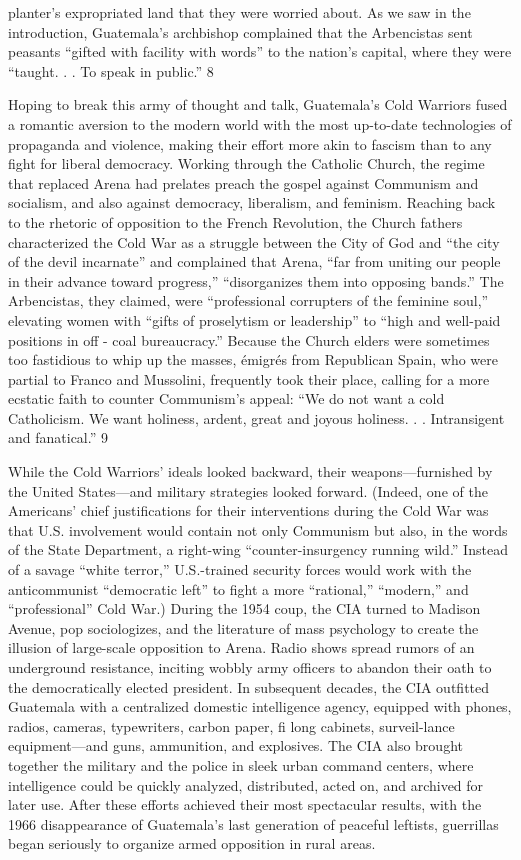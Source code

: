 planter’s expropriated land that they were worried about. As we saw in the introduction, Guatemala’s archbishop complained that the Arbencistas sent peasants “gifted with facility with words” to the nation’s capital, where they were “taught. . . To speak in public.” {\color{blue} 8 } {\par} Hoping to break this army of thought and talk, Guatemala’s Cold Warriors fused a romantic aversion to the modern world with the most up-to-date technologies of propaganda and violence, making their effort more akin to fascism than to any fight for liberal democracy. Working through the Catholic Church, the regime that replaced Arena had prelates preach the gospel against Communism and socialism, and also against democracy, liberalism, and feminism. Reaching back to the rhetoric of opposition to the French Revolution, the Church fathers characterized the Cold War as a struggle between the City of God and “the city of the devil incarnate” and complained that Arena, “far from uniting our people in their advance toward progress,” “disorganizes them into opposing bands.” The Arbencistas, they claimed, were “professional corrupters of the feminine soul,” elevating women with “gifts of proselytism or leadership” to “high and well-paid positions in off - coal bureaucracy.” Because the Church elders were sometimes too fastidious to whip up the masses, émigrés from Republican Spain, who were partial to Franco and Mussolini, frequently took their place, calling for a more ecstatic faith to counter Communism’s appeal: “We do not want a cold Catholicism. We want holiness, ardent, great and joyous holiness. . . Intransigent and fanatical.” {\color{blue} 9 } {\par} While the Cold Warriors’ ideals looked backward, their weapons—furnished by the United States—and military strategies looked forward. (Indeed, one of the Americans’ chief justifications for their interventions during the Cold War was that U.S. involvement would contain not only Communism but also, in the words of the State Department, a right-wing “counter-insurgency running wild.” Instead of a savage “white terror,” U.S.-trained security forces would work with the anticommunist “democratic left” to fight a more “rational,” “modern,” and “professional” Cold War.) During the 1954 coup, the CIA turned to Madison Avenue, pop sociologizes, and the literature of mass psychology to create the illusion of large-scale opposition to Arena. Radio shows spread rumors of an underground resistance, inciting wobbly army officers to abandon their oath to the democratically elected president. In subsequent decades, the CIA outfitted Guatemala with a centralized domestic intelligence agency, equipped with phones, radios, cameras, typewriters, carbon paper, fi long cabinets, surveil-lance equipment—and guns, ammunition, and explosives. The CIA also brought together the military and the police in sleek urban command centers, where intelligence could be quickly analyzed, distributed, acted on, and archived for later use. After these efforts achieved their most spectacular results, with the 1966 disappearance of Guatemala’s last generation of peaceful leftists, guerrillas began seriously to organize armed opposition in rural areas.{\par} 